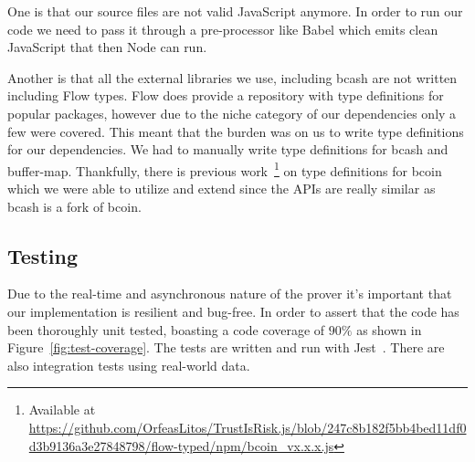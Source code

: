 One is that our source files are not valid JavaScript anymore. In order to run our code we need to pass it through a pre-processor like Babel which emits clean JavaScript that then Node can run.

Another is that all the external libraries we use, including bcash are not written including Flow types. Flow does provide a repository with type definitions for popular packages, however due to the niche category of our dependencies only a few were covered. This meant that the burden was on us to write type definitions for our dependencies. We had to manually write type definitions for bcash and buffer-map. Thankfully, there is previous work~\footnote{Available at \url{https://github.com/OrfeasLitos/TrustIsRisk.js/blob/247c8b182f5bb4bed11df0d3b9136a3e27848798/flow-typed/npm/bcoin_vx.x.x.js}} on type definitions for bcoin which we were able to utilize and extend since the APIs are really similar as bcash is a fork of bcoin.

\subsection{Testing}
Due to the real-time and asynchronous nature of the prover it's important that our implementation is resilient and bug-free. In order to assert that the code has been thoroughly unit tested, boasting a code coverage of $90\%$ as shown in Figure~\ref{fig:test-coverage}. The tests are written and run with Jest~\cite{jest}. There are also integration tests using real-world data.

